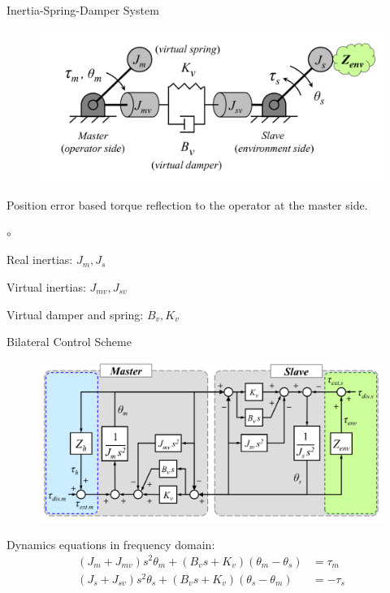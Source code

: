 \documentclass[10pt]{beamer}
\begin{document}
\begin{frame}{Inertia-Spring-Damper System}
	
	\begin{figure}[h]
	\centering
	\includegraphics[width=0.8\linewidth]{../reportTeleop/Images/spring_damper_inertia_system}
	\end{figure}

Position error based torque reflection to the operator at the
master side.
	
	\begin{list}{$ \circ $}{}
		\item Real inertias: $ J_{m}, J_{s} $
		\item Virtual inertias: $ J_{mv}, J_{sv} $
		\item Virtual damper and spring: $ B_{v}, K_{v} $
	\end{list}

\end{frame}

\begin{frame}{Bilateral Control Scheme}

	\begin{figure}
	\centering
	\includegraphics[width=0.8\linewidth]{../reportTeleop/Images/Block_diagram}
	\end{figure}

Dynamics equations in frequency domain:
\begin{align*}
	(J_m + J_{mv}) s^2 \theta_m + (B_v s + K_v) (\theta_m - \theta_s) &= \tau_m \\
	(J_s + J_{sv}) s^2 \theta_s + (B_v s + K_v) (\theta_s - \theta_m) &= -\tau_s 
\end{align*}
	
\end{frame}
\end{document}
